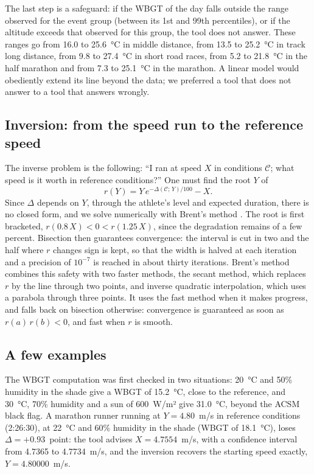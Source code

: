 \documentclass[11pt,a4paper]{article}
\begin{document}
The last step is a safeguard: if the WBGT of the day falls outside the range observed for the event group (between its
1st and 99th percentiles), or if the altitude exceeds that observed for this group, the tool does not answer. These
ranges go from 16.0 to 25.6~°C in middle distance, from 13.5 to 25.2~°C in track long distance, from 9.8 to 27.4~°C in
short road races, from 5.2 to 21.8~°C in the half marathon and from 7.3 to 25.1~°C in the marathon. A linear model
would obediently extend its line beyond the data; we preferred a tool that does not answer to a tool that answers
wrongly.

\subsection{Inversion: from the speed run to the reference speed}\label{sec:inversion}

The inverse problem is the following: ``I ran at speed $X$ in conditions $\mathcal{C}$; what speed is it worth in
reference conditions?'' One must find the root $Y$ of
\[
r(Y) = Y\,e^{-\Delta(\mathcal{C};\,Y)/100} - X .
\]
Since $\Delta$ depends on $Y$, through the athlete's level and expected duration, there is no closed form, and we solve
numerically with Brent's method \citep{brent1973}. The root is first bracketed, $r(0.8\,X) < 0 < r(1.25\,X)$, since the
degradation remains of a few percent. Bisection then guarantees convergence: the interval is cut in two and the half
where $r$ changes sign is kept, so that the width is halved at each iteration and a precision of $10^{-7}$ is reached in
about thirty iterations. Brent's method combines this safety with two faster methods, the secant method, which
replaces $r$ by the line through two points, and inverse quadratic interpolation, which uses a parabola through three
points. It uses the fast method when it makes progress, and falls back on bisection otherwise: convergence is
guaranteed as soon as $r(a)\,r(b) < 0$, and fast when $r$ is smooth.

\subsection{A few examples}\label{sec:examples}

The WBGT computation was first checked in two situations: 20~°C and 50\% humidity in the shade give a WBGT of 15.2~°C,
close to the reference, and 30~°C, 70\% humidity and a sun of 600~W/m² give 31.0~°C, beyond the ACSM black flag. A
marathon runner running at $Y = 4.80$~m/s in reference conditions (2:26:30), at 22~°C and 60\% humidity in the shade
(WBGT of 18.1~°C), loses $\Delta = +0.93$~point: the tool advises $X = 4.7554$~m/s, with a confidence interval from
4.7365 to 4.7734~m/s, and the inversion recovers the starting speed exactly, $Y = 4.80000$~m/s.
\end{document}
